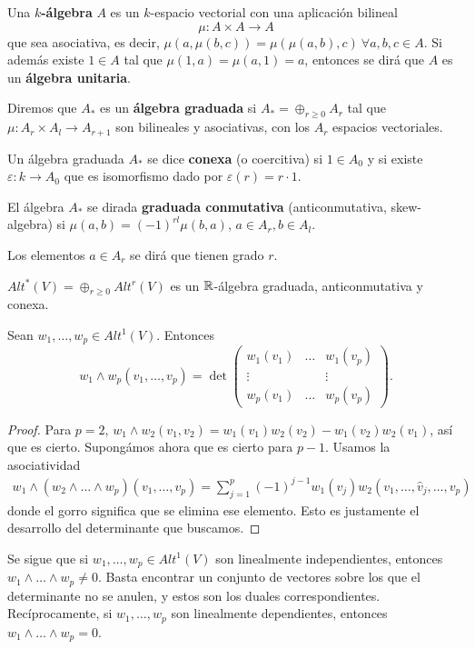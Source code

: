 \documentclass[CV.tex]{subfiles}
\begin{document}
\begin{defi}
Una \textbf{$k$-álgebra} $A$ es un $k$-espacio vectorial con una aplicación bilineal 
$$\mu:A\times A\to A$$
que sea asociativa, es decir, $\mu(a,\mu(b,c))=\mu(\mu(a,b),c)\ \forall a,b,c\in A$. Si además existe $1\in A$ tal que $\mu(1,a)=\mu(a,1)=a$, entonces se dirá que $A$ es un \textbf{álgebra unitaria}.

Diremos que $A_*$ es un \textbf{álgebra graduada} si $A_*=\oplus_{r\geq 0}A_r$ tal que $\mu:A_r\times A_l\to A_{r+1}$ son bilineales y asociativas, con los $A_r$ espacios vectoriales.

Un álgebra graduada $A_*$ se dice \textbf{conexa} (o coercitiva) si $1\in A_0$ y si existe $\varepsilon:k\to A_0$ que es isomorfismo dado por $\varepsilon(r)=r\cdot 1$.

El álgebra $A_*$ se dirada \textbf{graduada conmutativa} (anticonmutativa, skew-algebra) si $\mu(a,b)=(-1)^{rl}\mu(b,a)$, $a\in A_r,b\in A_l$. 
\end{defi}
\begin{nota} Los elementos $a\in A_r$ se dirá que tienen grado $r$.
\end{nota}

\begin{teorema}
$Alt^*(V)=\oplus_{r\geq 0} Alt^r(V)$ es un $\mathbb{R}$-álgebra graduada, anticonmutativa y conexa.
\end{teorema}
\begin{lemma}
Sean $w_1,\dots, w_p\in Alt^1(V)$. Entonces 
$$w_1\land w_p(v_1,\dots, v_p)=\det\begin{pmatrix}
w_1(v_1) &\dots & w_1(v_p)\\
\vdots & & \vdots\\
w_p(v_1) & \dots & w_p(v_p)
\end{pmatrix}.$$
\end{lemma}
\begin{proof}
Para $p=2$, $w_1\land w_2(v_1,v_2)=w_1(v_1)w_2(v_2)-w_1(v_2)w_2(v_1)$, así que es cierto.
Supongámos ahora que es cierto para $p-1$. Usamos la asociatividad
\begin{gather*}
w_1\land (w_2\land\dots\land w_p)(v_1,\dots, v_p)=\sum_{j=1}^p(-1)^{j-1}w_1(v_j)w_2(v_1,\dots, \hat{v}_j,\dots, v_p)
\end{gather*}
donde el gorro significa que se elimina ese elemento. Esto es justamente el desarrollo del determinante que buscamos.
\end{proof}
Se sigue que si $w_1,\dots, w_p\in Alt^1(V)$ son linealmente independientes, entonces $w_1\land\dots\land w_p\neq 0$. Basta encontrar un conjunto de vectores sobre los que el determinante no se anulen, y estos son los duales correspondientes. Recíprocamente, si $w_1,\dots, w_p$ son linealmente dependientes, entonces $w_1\land\dots\land w_p=0$. 
\end{document}

